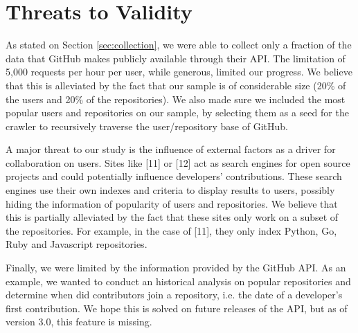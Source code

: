 
\section{Threats to Validity}
\label{sec:threats}

As stated on Section \ref{sec:collection}, we were able to collect only a fraction of the data that GitHub makes publicly available through their API. The limitation of 5,000 requests per hour per user, while generous, limited our progress. We believe that this is alleviated by the fact that our sample is of considerable size (20\% of the users and 20\% of the repositories). We also made sure we included the most popular users and repositories on our sample, by selecting them as a seed for the crawler to recursively traverse the user/repository base of GitHub.

A major threat to our study is the influence of external factors as a driver for collaboration on users.  Sites like [11] or [12] act as search engines for open source projects and could potentially influence developers' contributions. These search engines use their own indexes and criteria to display results to users, possibly hiding the information of popularity of users and repositories. We believe that this is partially alleviated by the fact that these sites only work on a subset of the repositories. For example, in the case of [11], they only index Python, Go, Ruby and Javascript repositories.

Finally, we were limited by the information provided by the GitHub API. As an example, we wanted to conduct an historical analysis on popular repositories and determine when did contributors join a repository, i.e. the date of a developer's first contribution. We hope this is solved on future releases of the API, but as of version 3.0, this feature is missing.
